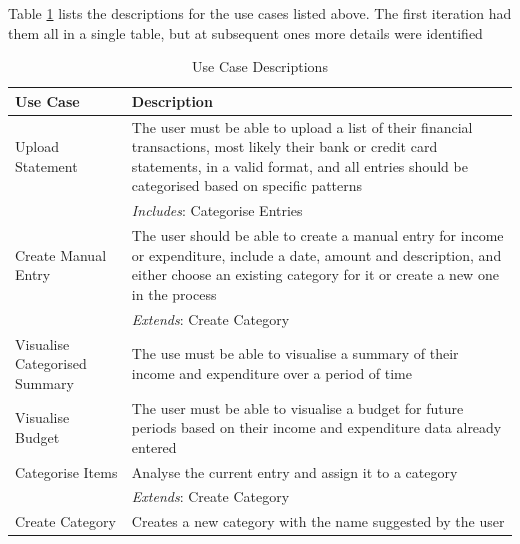Table \ref{tab:UseCaseDescriptions} lists the descriptions for the use cases
listed above. The first iteration had them all in a single table, but at
subsequent ones more details were identified
\begin{table}[ht!]
  \centering
  \begin{tabular}{|p{4cm}|p{12cm}|}
    \hline
    \textbf{Use Case}&\textbf{Description}\\
    \hline
    Upload Statement&The user must be able to upload a list of their
                     financial transactions, most likely their bank
                     or credit card statements, in a valid format, and all
                     entries should be categorised based on specific patterns\\
                    &\emph{Includes}: Categorise Entries\\
    \hline
    Create Manual Entry&The user should be able to create a manual entry for
                        income or expenditure, include a date, amount and
                        description, and either choose an existing category for
                        it or create a new one in the process\\
                       &\emph{Extends}: Create Category\\
    \hline
    Visualise Categorised Summary&The use must be able to visualise
                                  a summary of their income and expenditure
                                  over a period of time\\
    \hline
    Visualise Budget&The user must be able to visualise a budget for future
                     periods based on their income and expenditure data 
                     already entered\\
    \hline
    Categorise Items&Analyse the current entry and assign it to a category\\
                    &\emph{Extends}: Create Category\\
    \hline
    Create Category&Creates a new category with the name suggested by the
                        user\\
    \hline
  \end{tabular}
  \caption{Use Case Descriptions} \label{tab:UseCaseDescriptions}
\end{table}
\FloatBarrier


